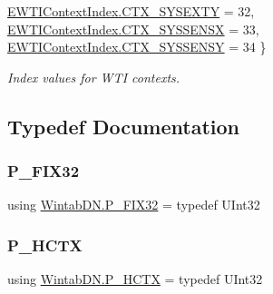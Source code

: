 \begin{DoxyCompactItemize}
\mbox{\hyperlink{namespace_wintab_d_n_a75b4777047ea6ca407c8cd928ca9ef26a9866fb8f9d6e115217bd7d40906f83cd}{E\+W\+T\+I\+Context\+Index.\+C\+T\+X\+\_\+\+S\+Y\+S\+E\+X\+TY}} = 32, 
\newline
\mbox{\hyperlink{namespace_wintab_d_n_a75b4777047ea6ca407c8cd928ca9ef26a87c965d49bfaa92097f18a0f07b89e0f}{E\+W\+T\+I\+Context\+Index.\+C\+T\+X\+\_\+\+S\+Y\+S\+S\+E\+N\+SX}} = 33, 
\mbox{\hyperlink{namespace_wintab_d_n_a75b4777047ea6ca407c8cd928ca9ef26afea64dc18968a391794238e812f46fdb}{E\+W\+T\+I\+Context\+Index.\+C\+T\+X\+\_\+\+S\+Y\+S\+S\+E\+N\+SY}} = 34
 \}
\begin{DoxyCompactList}\small\item\em Index values for W\+TI contexts. \end{DoxyCompactList}\end{DoxyCompactItemize}


\subsection{Typedef Documentation}
\mbox{\label{namespace_wintab_d_n_ae94d0383e02caff0b36afc0b8aa1cd32}} 
\subsubsection{\texorpdfstring{P\+\_\+\+F\+I\+X32}{P\_FIX32}}
{\footnotesize\ttfamily using \mbox{\hyperlink{namespace_wintab_d_n_ae94d0383e02caff0b36afc0b8aa1cd32}{Wintab\+D\+N.\+P\+\_\+\+F\+I\+X32}} = typedef U\+Int32}

\mbox{\label{namespace_wintab_d_n_a9ae61204cd14d7ef23008991d1fb6dff}} 
\subsubsection{\texorpdfstring{P\+\_\+\+H\+C\+TX}{P\_HCTX}}
{\footnotesize\ttfamily using \mbox{\hyperlink{namespace_wintab_d_n_a9ae61204cd14d7ef23008991d1fb6dff}{Wintab\+D\+N.\+P\+\_\+\+H\+C\+TX}} = typedef U\+Int32}

\mbox{\label{namespace_wintab_d_n_a33ba63b3dc16db27638a5f294140f53a}} 
